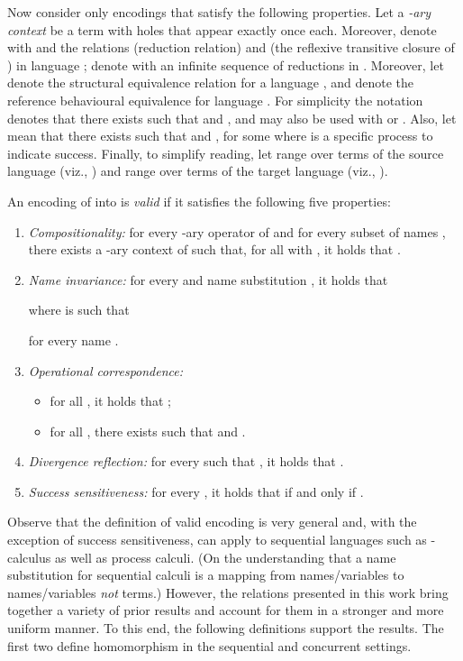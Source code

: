 \documentclass{llncs}
\begin{document}
Now consider only encodings that satisfy the following properties.
Let a {\em -ary context}  be a term with 
holes  that appear exactly once each.
Moreover, denote with  and  
the relations  (reduction relation) and
 (the reflexive transitive closure of ) in language ;
denote with  an infinite sequence of reductions in .
Moreover,
let  denote the structural equivalence relation for a language , and
 denote the reference behavioural equivalence for language .
For simplicity the notation  denotes that there exists 
such that  and , and may also be used with 
or . Also, let  mean that there exists  such that  and ,
for some  where  is a specific process to indicate success.
Finally, to simplify reading, let  range
over terms of the source language (viz., ) and  range
over terms of the target language (viz., ).

\begin{definition}
\label{def:ve}
An encoding  of  into 
is {\em valid} if it satisfies the following five properties:
\begin{enumerate}
\item {\em Compositionality:} for every -ary operator  of 
and for every subset of names ,
there exists a -ary context  of 
such that, for all  with , it holds
that .

\item {\em Name invariance:}
for every  and name substitution , it holds that

where  is such that 

for every name .

\item {\em Operational correspondence:}
\begin{itemize}
\item for all , it holds that ;
\item for all , there exists  such that  
and .
\end{itemize}

\item {\em Divergence reflection:}
for every  such that 
, it holds that 
\linebreak  \mbox{}.

\item {\em Success sensitiveness:}
for every , it holds that  if and only if .
\end{enumerate}
\end{definition}

Observe that the definition of valid encoding is very general and, with the exception
of success sensitiveness, can apply to sequential languages such as -calculus
as well as process calculi.
(On the understanding that a name substitution for sequential
calculi is a mapping from names/variables to names/variables {\em not} terms.)
However, the relations presented in this work bring together a variety of
prior results and account for them in a stronger and more uniform manner.
To this end, the following definitions support the results.
The first two define homomorphism in the sequential and concurrent settings.
\end{document}
